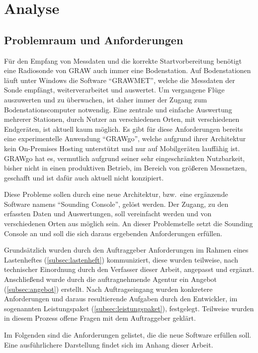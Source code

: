\section{Analyse}

\subsection{Problemraum und Anforderungen}
Für den Empfang von Messdaten und die korrekte Startvorbereitung benötigt eine Radiosonde von GRAW auch immer eine Bodenstation.
Auf Bodenstationen läuft unter Windows die Software \enquote{GRAWMET}\cite{grawmet}, welche die Messdaten der Sonde empfängt, weiterverarbeitet und auswertet.
Um vergangene Flüge auszuwerten und zu überwachen, ist daher immer der Zugang zum Bodenstationscomputer notwendig.
Eine zentrale und einfache Auswertung mehrerer Stationen, durch Nutzer an verschiedenen Orten, mit verschiedenen Endgeräten, ist aktuell kaum möglich.
Es gibt für diese Anforderungen bereits eine experimentelle Anwendung \enquote{GRAWgo}\cite{grawgo}, welche aufgrund ihrer Architektur kein On-Premises Hosting unterstützt und nur auf Mobilgeräten lauffähig ist.
GRAWgo hat es, vermutlich aufgrund seiner sehr eingeschränkten Nutzbarkeit, bisher nicht in einen produktiven Betrieb, im Bereich von größeren Messnetzen, geschafft und ist dafür auch aktuell nicht konzipiert.

Diese Probleme sollen durch eine neue Architektur, bzw.\ eine ergänzende Software namens \enquote{Sounding Console}, gelöst werden.
Der Zugang, zu den erfassten Daten und Auswertungen, soll vereinfacht werden und von verschiedenen Orten aus möglich sein.
An dieser Problemstelle setzt die Sounding Console an und soll die sich daraus ergebenden Anforderungen erfüllen.

Grundsätzlich wurden durch den Auftraggeber Anforderungen im Rahmen eines Lastenheftes (\ref{subsec:lastenheft}) kommuniziert, diese wurden teilweise, nach technischer Einordnung durch den Verfasser dieser Arbeit, angepasst und ergänzt.
Anschließend wurde durch die auftragnehmende Agentur ein Angebot (\ref{subsec:angebot}) erstellt.
Nach Auftragseingang wurden konkretere Anforderungen und daraus resultierende Aufgaben durch den Entwickler, im sogenannten Leistungspaket (\ref{subsec:leistungspaket}), festgelegt.
Teilweise wurden in diesem Prozess offene Fragen mit dem Auftraggeber geklärt.

Im Folgenden sind die Anforderungen gelistet, die die neue Software erfüllen soll.
Eine ausführlichere Darstellung findet sich im Anhang dieser Arbeit.
\newpage

